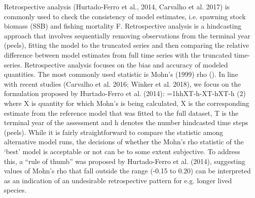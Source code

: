 Retrospective analysis (Hurtado-Ferro et al., 2014, Carvalho et al. 2017) is commonly used to check the consistency of model estimates, i.e. spawning stock biomass (SSB) and fishing mortality F. Retrospective analysis is a hindcasting approach that involves sequentially removing observations from the terminal year (peels), fitting the model to the truncated series and then comparing the relative difference between model estimates from full time series with the truncated time-series. Retrospective analysis focuses on the bias and accuracy of modeled quantities. The most commonly used statistic is Mohn’s (1999) rho (). In line with recent studies (Carvalho et al. 2016; Winker et al. 2018), we focus on the formulation proposed by Hurtado-Ferro et al. (2014): 
=1hhXT-h-XT-hXT-h                                    (2)
where X  is quantity for which Mohn’s is being calculated, X is the corresponding estimate from the reference model that was fitted to the full dataset, T is the terminal year of the assessment and h denotes the number hindcasted time steps (peels). While it is fairly straightforward to compare the  statistic among alternative model runs, the decisions of whether the Mohn’s rho statistic of the ‘best’ model is acceptable or not can be to some extent subjective. To address this, a “rule of thumb” was proposed by Hurtado-Ferro et al. (2014), suggesting values of Mohn’s rho that fall outside the range (-0.15 to 0.20) can be interpreted as an indication of an undesirable retrospective pattern for e.g. longer lived species.


